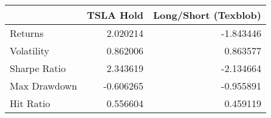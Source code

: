 \begin{tabular}{lrr}
\toprule
{} &  TSLA Hold &  Long/Short (Texblob) \\
\midrule
Returns      &   2.020214 &             -1.843446 \\
Volatility   &   0.862006 &              0.863577 \\
Sharpe Ratio &   2.343619 &             -2.134664 \\
Max Drawdown &  -0.606265 &             -0.955891 \\
Hit Ratio    &   0.556604 &              0.459119 \\
\bottomrule
\end{tabular}
